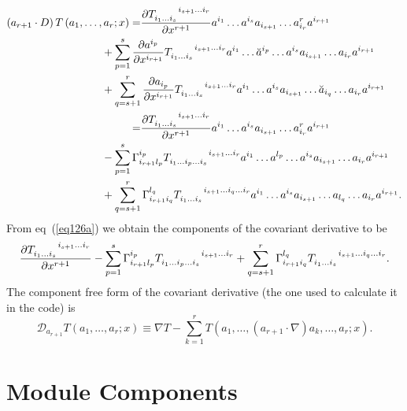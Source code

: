 \documentclass[12pt]{report}
\newcommand{\bfrac}[2]{\displaystyle\frac{#1}{#2}}
\newcommand{\lp}{\left (}
\newcommand{\rp}{\right )}
\newcommand{\pdiff}[2]{\bfrac{\partial {#1}}{\partial {#2}}}
\newcommand{\f}[2]{{#1}\lp {#2} \rp}
\newcommand{\paren}[1]{\lp {#1} \rp}
\begin{document}
\begin{align}
	\paren{a_{r+1}\cdot D} \f{T}{a_{1},\dots,a_{r};x} =& 
		\pdiff{T\indices{_{i_{1}\dots i_{s}}^{i_{s+1}\dots i_{r}}}}{x^{r+1}}a^{i_{1}}\dots a^{i_{s}}a_{i_{s+1}}\dots a^{r}_{i_{r}}
		a^{i_{r+1}} \nonumber \\
		&\hspace{-0.5in}+ \sum_{p=1}^{s}\pdiff{a^{i_{p}}}{x^{i_{r+1}}}T\indices{_{i_{1}\dots i_{s}}^{i_{s+1}\dots i_{r}}}a^{i_{1}}\dots
		\breve{a}^{i_{p}}\dots a^{i_{s}}a_{i_{s+1}}\dots a_{i_{r}}a^{i_{r+1}} \nonumber \\
		&\hspace{-0.5in}+ \sum_{q=s+1}^{r}\pdiff{a_{i_{p}}}{x^{i_{r+1}}}T\indices{_{i_{1}\dots i_{s}}^{i_{s+1}\dots i_{r}}}a^{i_{1}}\dots
		a^{i_{s}}a_{i_{s+1}}\dots\breve{a}_{i_{q}}\dots a_{i_{r}}a^{i_{r+1}} \nonumber \\
		=& \pdiff{T\indices{_{i_{1}\dots i_{s}}^{i_{s+1}\dots i_{r}}}}{x^{r+1}}a^{i_{1}}\dots a^{i_{s}}a_{i_{s+1}}\dots a^{r}_{i_{r}}
		a^{i_{r+1}} \nonumber \\
		&\hspace{-0.5in}- \sum_{p=1}^{s}\Gamma_{i_{r+1}l_{p}}^{i_{p}}T\indices{_{i_{1}\dots i_{p}\dots i_{s}}^{i_{s+1}
		\dots i_{r}}}a^{i_{1}}\dots
		a^{l_{p}}\dots a^{i_{s}}a_{i_{s+1}}\dots a_{i_{r}}a^{i_{r+1}} \nonumber \\
		&\hspace{-0.5in}+ \sum_{q=s+1}^{r}\Gamma_{i_{r+1}i_{q}}^{l_{q}}T\indices{_{i_{1}\dots i_{s}}^{i_{s+1}\dots i_{q}
		\dots i_{r}}}a^{i_{1}}\dots
		a^{i_{s}}a_{i_{s+1}}\dots a_{l_{q}}\dots a_{i_{r}}a^{i_{r+1}}	.	\label{eq126a}
\end{align}
From eq~(\ref{eq126a}) we obtain the components of the covariant derivative to be
\begin{align}
	\pdiff{T\indices{_{i_{1}\dots i_{s}}^{i_{s+1}\dots i_{r}}}}{x^{r+1}}
	- \sum_{p=1}^{s}\Gamma_{i_{r+1}l_{p}}^{i_{p}}T\indices{_{i_{1}\dots i_{p}\dots i_{s}}^{i_{s+1}\dots i_{r}}}
	+ \sum_{q=s+1}^{r}\Gamma_{i_{r+1}i_{q}}^{l_{q}}T\indices{_{i_{1}\dots i_{s}}^{i_{s+1}\dots i_{q}\dots i_{r}}}.
\end{align}
The component free form of the covariant derivative (the one used to calculate it in the code) is
\begin{equation}
	\mathcal{D}_{a_{r+1}} \f{T}{a_{1},\dots,a_{r};x} \equiv \nabla T 
		- \sum_{k=1}^{r}\f{T}{a_{1},\dots,\paren{a_{r+1}\cdot\nabla} a_{k},\dots,a_{r};x}.
\end{equation}

\chapter{Module Components}
\end{document}
